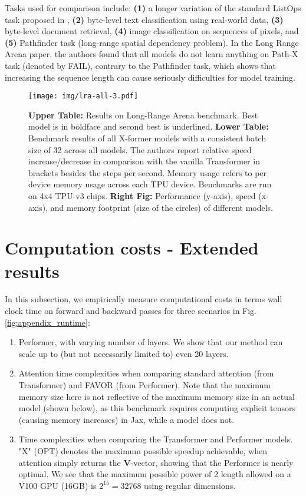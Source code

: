Tasks used for comparison include: \textbf{(1)} a longer variation of the standard ListOps task proposed in \citep{listops}, \textbf{(2)} byte-level text classification using real-world data, \textbf{(3)} byte-level document retrieval, \textbf{(4)} image classification on sequences of pixels, and \textbf{(5)} Pathfinder task (long-range spatial dependency problem). In the Long Range Arena paper, the authors found that all models do not learn anything on Path-X task (denoted by FAIL), contrary to the Pathfinder task, which shows that increasing the sequence length can cause seriously difficulties for model training.
\vspace{0.2cm}
\begin{figure}[h]
  \centering
  \texttt{[image: img/lra-all-3.pdf]}
  \vspace{0.15cm}
  \caption{\textbf{Upper Table:} Results on Long-Range Arena benchmark. Best model is in boldface and second best is underlined. \textbf{Lower Table:} Benchmark results of all X-former models with a consistent batch size of 32 across all models. The authors report relative speed increase/decrease in comparison with the vanilla Transformer in brackets besides the steps per second. Memory usage refers to per device memory usage across each TPU device. Benchmarks are run on 4x4 TPU-v3 chips. \textbf{Right Fig:} Performance (y-axis), speed (x-axis), and memory footprint (size of the circles) of different models.} 
  \label{fig:lra_figure}
\end{figure}

\newpage 

\section{Computation costs - Extended results}

In this subsection, we empirically measure computational costs in terms wall clock time on forward and backward passes for three scenarios in Fig. \ref{fig:appendix_runtime}:
\begin{enumerate}
\item Performer, with varying number of layers. We show that our method can scale up to (but not necessarily limited to) even 20 layers.
\item Attention time complexities when comparing standard attention (from Transformer) and FAVOR (from Performer). Note that the maximum memory size here is not reflective of the maximum memory size in an actual model (shown below), as this benchmark requires computing explicit tensors (causing memory increases) in Jax, while a model does not.
\item Time complexities when comparing the Transformer and Performer models. "X" (OPT) denotes the maximum possible speedup achievable, when attention simply returns the $\mathbf{V}$-vector, showing that the Performer is nearly optimal. We see that the maximum possible power of 2 length allowed on a V100 GPU (16GB) is $2^{15} = 32768$ using regular dimensions.
\end{enumerate}

